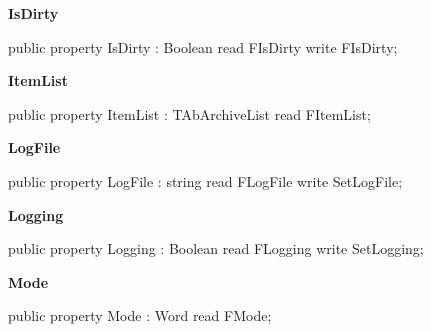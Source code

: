 \documentclass{report}
\newif\ifpdf
\begin{document}
\begin{list}{}
\begin{flushleft}
\ifpdf
\end{flushleft}
\fi


\par  \label{AbArcTyp.TAbArchive-IsDirty}
\item[\textbf{IsDirty}\hfill]
\ifpdf
\begin{flushleft}
\fi
\begin{ttfamily}
public property IsDirty : Boolean
      read FIsDirty
      write FIsDirty;\end{ttfamily}

\ifpdf
\end{flushleft}
\fi


\par  \label{AbArcTyp.TAbArchive-ItemList}
\item[\textbf{ItemList}\hfill]
\ifpdf
\begin{flushleft}
\fi
\begin{ttfamily}
public property ItemList : TAbArchiveList
      read FItemList;\end{ttfamily}

\ifpdf
\end{flushleft}
\fi


\par  \label{AbArcTyp.TAbArchive-LogFile}
\item[\textbf{LogFile}\hfill]
\ifpdf
\begin{flushleft}
\fi
\begin{ttfamily}
public property LogFile : string
      read FLogFile
      write SetLogFile;\end{ttfamily}

\ifpdf
\end{flushleft}
\fi


\par  \label{AbArcTyp.TAbArchive-Logging}
\item[\textbf{Logging}\hfill]
\ifpdf
\begin{flushleft}
\fi
\begin{ttfamily}
public property Logging : Boolean
      read FLogging
      write SetLogging;\end{ttfamily}

\ifpdf
\end{flushleft}
\fi


\par  \label{AbArcTyp.TAbArchive-Mode}
\item[\textbf{Mode}\hfill]
\ifpdf
\begin{flushleft}
\fi
\begin{ttfamily}
public property Mode : Word
      read FMode;\end{ttfamily}


\end{flushleft}
\end{list}
\end{document}
